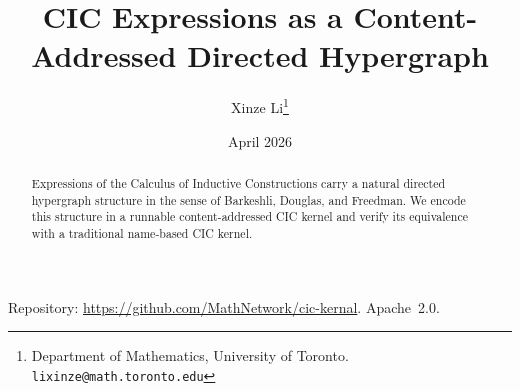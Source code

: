 \documentclass[11pt]{article}
\title{CIC Expressions as a Content-Addressed Directed Hypergraph}
\author{
  Xinze Li\thanks{Department of Mathematics, University of Toronto. \texttt{lixinze@math.toronto.edu}}
}
\date{April 2026}
\begin{document}
\maketitle

\begin{abstract}
Expressions of the Calculus of Inductive Constructions carry a natural directed hypergraph structure in the sense of Barkeshli, Douglas, and Freedman.  We encode this structure in a runnable content-addressed CIC kernel and verify its equivalence with a traditional name-based CIC kernel.
\end{abstract}

\vspace{2pt}
{\small\noindent Repository: \url{https://github.com/MathNetwork/cic-kernal}. Apache~2.0.}

{\small\tableofcontents}
\newpage










\appendix


\end{document}
